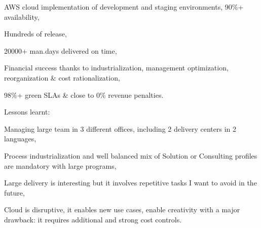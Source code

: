 \begin{cventries}
{\begin{cvitems}
\begin{cvsubitems}
          \item {AWS cloud implementation of development and staging environments, 90\%+ availability,}
          \item {Hundreds of release,}
          \item {20000+ man.days delivered on time,}
          \item {Financial success thanks to industrialization, management optimization, reorganization \& cost rationalization,}
          \item {98\%+ green SLAs \& close to 0\% revenue penalties.}
        \end{cvsubitems}
        \item {Lessons learnt:}
        \begin{cvsubitems}
          \item {Managing large team in 3 different offices, including 2 delivery centers in 2 languages,}
          \item {Process industrialization and well balanced mix of Solution or Consulting profiles are mandatory with large programs,}
          \item {Large delivery is interesting but it involves repetitive tasks I want to avoid in the future,}
          \item {Cloud is disruptive, it enables new use cases, enable creativity with a major drawback: it requires additional and strong cost controls.}
        \end{cvsubitems}
      \end{cvitems}
    }


\end{cventries}
